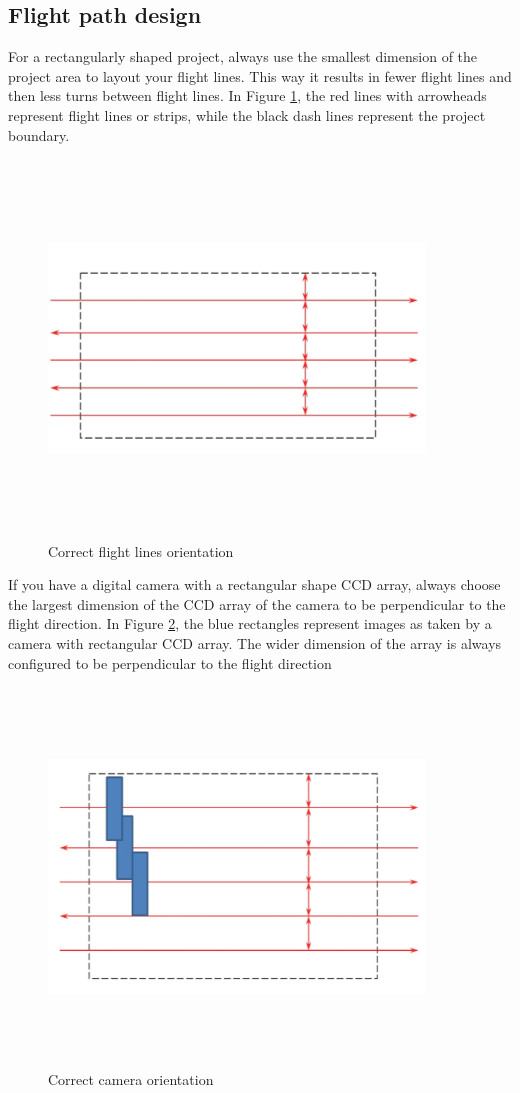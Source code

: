 \subsection{Flight path design}
For a rectangularly shaped project, always use the smallest dimension of the project area to layout your flight lines. This way it results in fewer flight lines and then less turns between flight lines. In Figure \ref{fig:line_orientaion}, the red lines with arrowheads represent flight lines or strips, while the black dash lines represent the project boundary.
\begin{figure}[H]
\centering
\includegraphics[width=10cm,height=10cm,keepaspectratio]{imagenes/flight_path.PNG}
\caption{Correct flight lines orientation}
\label{fig:line_orientaion}
\end{figure}
If you have a digital camera with a rectangular shape CCD array, always choose the largest dimension of the CCD array of the camera to be perpendicular to the flight direction. In Figure \ref{fig:camera_orientaion}, the blue rectangles represent images as taken by a camera with rectangular CCD array. The wider dimension of the array is always configured to be perpendicular to the flight direction\cite{GCP}
\begin{figure}[H]
\centering
\includegraphics[width=10cm,height=10cm,keepaspectratio]{imagenes/flight_path_oritentation.PNG}
\caption{Correct camera orientation}
\label{fig:camera_orientaion}
\end{figure}
